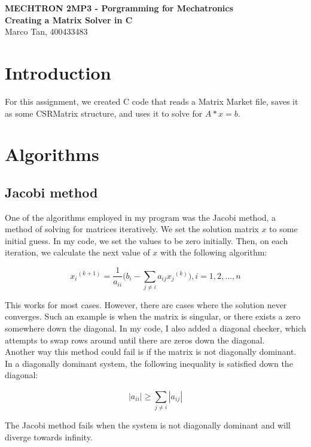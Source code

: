 \documentclass[12pt]{article}
\begin{document}
	
	\justifying
	
	\begin{center}
		\textbf{{\large MECHTRON 2MP3 - Porgramming for Mechatronics}} \\
		\textbf{Creating a Matrix Solver in C} \\
		Marco Tan, 400433483
	\end{center}
	
	\section{Introduction}
    For this assignment, we created C code that reads a Matrix Market file, saves it as some CSRMatrix structure, and uses it to solve for $A*x=b$.

    \section{Algorithms}
    \subsection{Jacobi method}
    One of the algorithms employed in my program was the Jacobi method, a method of solving for matrices iteratively. We set the solution matrix $x$ to some initial guess. In my code, we set the values to be zero initially. Then, on each iteration, we calculate the next value of $x$ with the following algorithm:

    \[
     {x_{i}}^{(k+1)} =  \frac{1}{a_{ii}} \big(b_{i} -  \sum_{j\neq i}^{}{a_{ij}{x_{j}}^{(k)}} \big), i=1,2,...,n
    \]

    This works for most cases. However, there are cases where the solution never converges. Such an example is when the matrix is singular, or there exists a zero somewhere down the diagonal. In my code, I also added a diagonal checker, which attempts to swap rows around until there are zeros down the diagonal. \\

    Another way this method could fail is if the matrix is not diagonally dominant. In a diagonally dominant system, the following inequality is satisfied down the diagonal:

    \[
    |a_{ii}|  \geq  \sum_{j\neq i}^{}|a_{ij}| 
    \]

    The Jacobi method fails when the system is not diagonally dominant and will diverge towards infinity.
\end{document}
